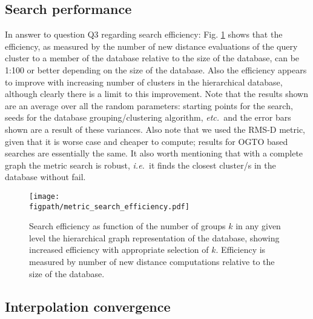 \documentclass[journal=jctcce,manuscript=article]{achemso}
\newlength{\figwidth}
\newcommand{\figpath}{Figures}
\newcommand{\fref}[1]{{Fig. \ref{#1}}}
\newcommand{\ie}{{\it i.e.\ }}
\newcommand{\etc}{{\it etc.\ }}
\begin{document}
\subsection{Search performance}
In answer to question Q3 regarding search efficiency: \fref{fig:search_efficiency} shows that the efficiency, as measured by the number of new distance evaluations of the query cluster to a member of the database relative to the size of the database, can be 1:100 or better depending on the size of the database.
Also the efficiency appears to improve with increasing number of clusters in the hierarchical database, although clearly there is a limit to this improvement.
Note that the results shown are an average over all the random parameters: starting points for the search, seeds for the database grouping/clustering algorithm, \etc and the error bars shown are a result of these variances.
Also note that we used the RMS-D metric, given that it is worse case and cheaper to compute; results for OGTO based searches are essentially the same.
It also worth mentioning that with a complete graph the metric search is robust, \ie it finds the closest cluster/s in the database without fail.


\begin{figure}[h]
{\texttt{[image: \\figpath/metric\_search\_efficiency.pdf]}}
\caption{Search efficiency as function of the number of groups $k$ in any given level the hierarchical graph representation of the database,
 showing increased efficiency with appropriate selection of $k$.
Efficiency is measured by number of new distance computations relative to the size of the database.
}
\label{fig:search_efficiency}
\end{figure}

\subsection{Interpolation convergence}
\end{document}
